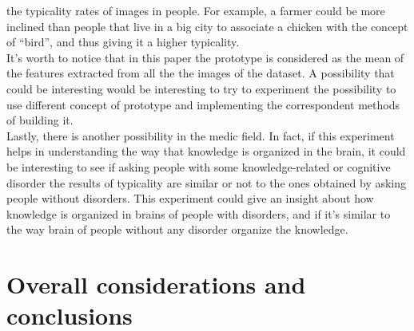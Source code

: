 \documentclass[conference]{IEEEtran}
\begin{document}
			the typicality rates of images in people. For example, a farmer could be more inclined than people that live in a big city to associate a chicken with the concept of ``bird'', and thus giving 
			it a higher typicality.\\
			It's worth to notice that in this paper the prototype is considered as the mean of the features extracted from all the the images of the dataset. A possibility that could be interesting would be 
			interesting to try to experiment the possibility to use different concept of prototype and implementing the correspondent methods of building it.\\
			Lastly, there is another possibility in the medic field. In fact, if this experiment helps in understanding the way that knowledge is organized in the brain, it could be interesting to see if 
			asking people with some knowledge-related or cognitive disorder the results of typicality are similar or not to the ones obtained by asking people without disorders. This experiment could give 
			an insight about how knowledge is organized in brains of people with disorders, and if it's similar to the way brain of people without any disorder organize the knowledge. 
	
	\section{Overall considerations and conclusions}
	
\end{document}
